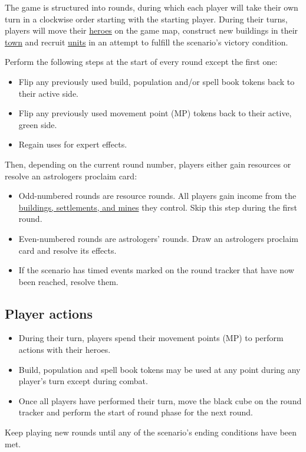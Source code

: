 The game is structured into rounds, during which each player will take their own turn in a clockwise order starting with the starting player.
During their turns, players will move their \hyperlink{Heroes}{heroes} on the game map, construct new buildings in their \hyperlink{Town}{town} and recruit \hyperlink{Units}{units} in an attempt to fulfill the scenario’s victory condition.\par
Perform the following steps at the start of every round except the first one:
\begin{itemize}
  \item Flip any previously used build, population and/or spell book tokens back to their active side.
  \item Flip any previously used movement point (MP) tokens back to their active, green side.
  \item Regain uses for expert effects.
\end{itemize}
Then, depending on the current round number, players either gain resources or resolve an astrologers proclaim card:
\begin{itemize}
  \item Odd-numbered rounds are resource rounds.
    All players gain income from the \hyperlink{Mines}{buildings, settlements, and mines} they control.
    Skip this step during the first round.
  \item Even-numbered rounds are astrologers’ rounds.
    Draw an astrologers proclaim card and resolve its effects.
  \item If the scenario has timed events marked on the round tracker that have now been reached, resolve them.
\end{itemize}
\subsection*{Player actions}
\begin{itemize}
  \item During their turn, players spend their movement points (MP) to perform actions with their heroes.
  \item Build, population and spell book tokens may be used at any point during any player’s turn except during combat.
  \item Once all players have performed their turn, move the black cube on the round tracker and perform the start of round phase for the next round.
\end{itemize}
Keep playing new rounds until any of the scenario’s ending conditions have been met.
